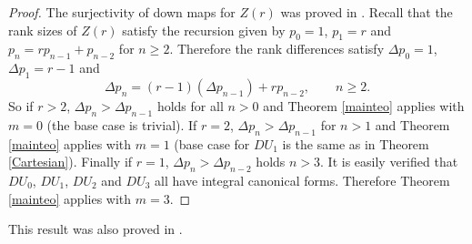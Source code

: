 \documentclass[ALCO, Unicode]{cedram}
\begin{document}
\begin{proof} The surjectivity of down maps for $ Z(r) $  was proved in \cite[\S 5]{Miller}. Recall that the rank sizes of $ Z(r) $ satisfy the recursion given by $ p_{0} = 1 $, $ p_{1} = r $  and  $ p_{n} = r p_{n-1} + p_{n-2} $ for $ n \geq 2 $. Therefore the rank differences satisfy $ \Delta p_{0} = 1 $,  $ \Delta p_{1} =  r  -  1  $ and $$  \Delta p_{n} =   (r-1) ( \Delta p_{n-1} )  +  r  p_{n-2} ,  \quad \quad  n \geq 2 . 
$$ 
So if $ r > 2 $,  $ \Delta p_{n} > \Delta p_{n-1} $ holds  for all $ n > 0 $ and Theorem \ref{mainteo} applies with $ m = 0 $ (the base case is trivial). If $ r = 2 $, $ \Delta p_{n} > \Delta p_{n-1} $ for $ n > 1 $ and Theorem \ref{mainteo} applies with $ m = 1 $ (base case for $ DU_{1}$ is the same as in Theorem \ref{Cartesian}). Finally if $ r = 1 $, $ \Delta p_{n} > \Delta p_{n-2} $ holds  $ n  >  3   $. It is easily verified that $ DU_{0} $, $ DU_{1} $, $ DU_{2} $ and $ DU_{3} $ all have integral canonical forms.  Therefore Theorem \ref{mainteo} applies with $ m = 3 $.    
\end{proof}    


\begin{remark} This result   was also proved in \cite[\S 5]{Miller}.  
\end{remark} 





\end{document}
